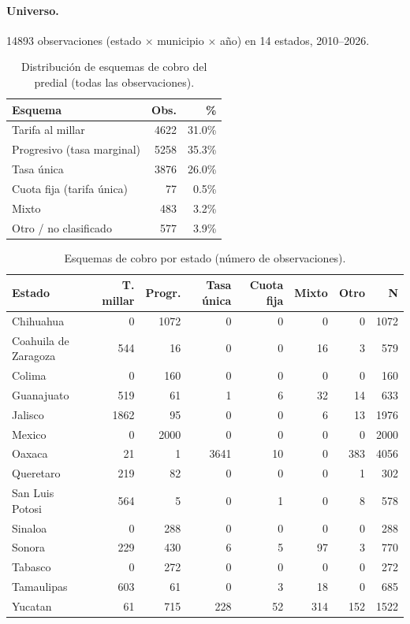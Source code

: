 
\paragraph{Universo.} 14893 observaciones (estado $\times$ municipio $\times$ año) en 14 estados, 2010--2026.

\begin{table}[htbp]\centering\small
\begin{tabular}{lrr}
\toprule
Esquema & Obs. & \% \\
\midrule
Tarifa al millar & 4622 & 31.0\% \\
Progresivo (tasa marginal) & 5258 & 35.3\% \\
Tasa única & 3876 & 26.0\% \\
Cuota fija (tarifa única) & 77 & 0.5\% \\
Mixto & 483 & 3.2\% \\
Otro / no clasificado & 577 & 3.9\% \\
\bottomrule
\end{tabular}
\caption{Distribución de esquemas de cobro del predial (todas las observaciones).}
\label{tab:dist-global-esquemas}
\end{table}

\begin{table}[htbp]\centering\small
\begin{tabular}{lrrrrrrr}
\toprule
Estado & T. millar & Progr. & Tasa única & Cuota fija & Mixto & Otro & N \\
\midrule
Chihuahua & 0 & 1072 & 0 & 0 & 0 & 0 & 1072 \\
Coahuila de Zaragoza & 544 & 16 & 0 & 0 & 16 & 3 & 579 \\
Colima & 0 & 160 & 0 & 0 & 0 & 0 & 160 \\
Guanajuato & 519 & 61 & 1 & 6 & 32 & 14 & 633 \\
Jalisco & 1862 & 95 & 0 & 0 & 6 & 13 & 1976 \\
Mexico & 0 & 2000 & 0 & 0 & 0 & 0 & 2000 \\
Oaxaca & 21 & 1 & 3641 & 10 & 0 & 383 & 4056 \\
Queretaro & 219 & 82 & 0 & 0 & 0 & 1 & 302 \\
San Luis Potosi & 564 & 5 & 0 & 1 & 0 & 8 & 578 \\
Sinaloa & 0 & 288 & 0 & 0 & 0 & 0 & 288 \\
Sonora & 229 & 430 & 6 & 5 & 97 & 3 & 770 \\
Tabasco & 0 & 272 & 0 & 0 & 0 & 0 & 272 \\
Tamaulipas & 603 & 61 & 0 & 3 & 18 & 0 & 685 \\
Yucatan & 61 & 715 & 228 & 52 & 314 & 152 & 1522 \\
\bottomrule
\end{tabular}
\caption{Esquemas de cobro por estado (número de observaciones).}
\label{tab:esquemas-por-estado}
\end{table}

